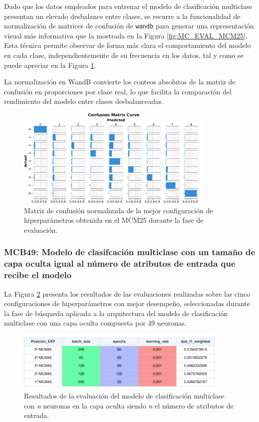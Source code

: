 Dado que los datos empleados para entrenar el modelo de clasificación multiclase presentan un elevado desbalance entre clases, se recurre a la funcionalidad de normalización de matrices de confusión de \texttt{wandb} para generar una representación visual más informativa que la mostrada en la Figura \ref{fig:MC_EVAL_MCM25}. Esta técnica permite observar de forma más clara el comportamiento del modelo en cada clase, independientemente de su frecuencia en los datos, tal y como se puede apreciar en la Figura \ref{fig:MCNorm_EVAL_MCM25}.

La normalización en WandB convierte los conteos absolutos de la matriz de confusión en proporciones por clase real, lo que facilita la comparación del rendimiento del modelo entre clases desbalanceadas.

\begin{figure}[H]
    \centering
    \includegraphics[width=0.85\textwidth]{./img/evaluacion/matrices_confusion/MCNorm_EVAL_MCM25.pdf}
    \caption{Matriz de confusión normalizada de la mejor configuración de hiperparámetros obtenida en el MCM25 durante la fase de evaluación.}
    \label{fig:MCNorm_EVAL_MCM25}
\end{figure}



\subsubsection{MCB49: Modelo de clasifcación multiclase con un tamaño de capa oculta igual al número de atributos de entrada que recibe el modelo}
La Figura \ref{fig:EVALMCM49} presenta los resultados de las evaluaciones realizadas sobre las cinco configuraciones de hiperparámetros con mejor desempeño, seleccionadas durante la fase de búsqueda aplicada a la arquitectura del modelo de clasificación multiclase con una capa oculta compuesta por 49 neuronas.

\begin{figure}[H]
    \centering
    \includegraphics[width=0.9\textwidth]{./img/evaluacion/resultados/EVALMCM49.pdf}
    \caption{Resultados de la evaluación del modelo de clasificación multiclase con \textit{n} neuronas en la capa oculta siendo \textit{n} el número de atributos de entrada.}
    \label{fig:EVALMCM49}
\end{figure}

